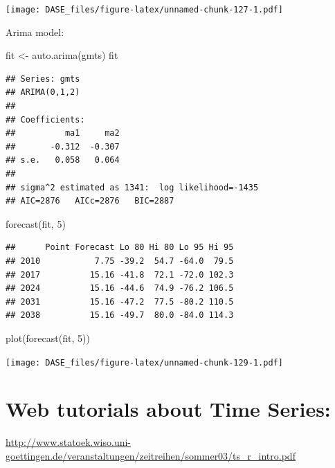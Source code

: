 \documentclass[
]{book}
\newenvironment{Shaded}{\begin{snugshade}}{\end{snugshade}}
\newcommand{\DecValTok}[1]{\textcolor[rgb]{0.00,0.00,0.81}{#1}}
\newcommand{\FunctionTok}[1]{\textcolor[rgb]{0.00,0.00,0.00}{#1}}
\newcommand{\NormalTok}[1]{#1}
\newcommand{\OtherTok}[1]{\textcolor[rgb]{0.56,0.35,0.01}{#1}}
\begin{document}
\texttt{[image: DASE\_files/figure-latex/unnamed-chunk-127-1.pdf]}

Arima model:

\begin{Shaded}
\begin{Highlighting}[]
\NormalTok{fit }\OtherTok{\textless{}{-}} \FunctionTok{auto.arima}\NormalTok{(gmts)}
\NormalTok{fit}
\end{Highlighting}
\end{Shaded}

\begin{verbatim}
## Series: gmts 
## ARIMA(0,1,2) 
## 
## Coefficients:
##          ma1     ma2
##       -0.312  -0.307
## s.e.   0.058   0.064
## 
## sigma^2 estimated as 1341:  log likelihood=-1435
## AIC=2876   AICc=2876   BIC=2887
\end{verbatim}

\begin{Shaded}
\begin{Highlighting}[]
\FunctionTok{forecast}\NormalTok{(fit, }\DecValTok{5}\NormalTok{)}
\end{Highlighting}
\end{Shaded}

\begin{verbatim}
##      Point Forecast Lo 80 Hi 80 Lo 95 Hi 95
## 2010           7.75 -39.2  54.7 -64.0  79.5
## 2017          15.16 -41.8  72.1 -72.0 102.3
## 2024          15.16 -44.6  74.9 -76.2 106.5
## 2031          15.16 -47.2  77.5 -80.2 110.5
## 2038          15.16 -49.7  80.0 -84.0 114.3
\end{verbatim}

\begin{Shaded}
\begin{Highlighting}[]
\FunctionTok{plot}\NormalTok{(}\FunctionTok{forecast}\NormalTok{(fit, }\DecValTok{5}\NormalTok{))}
\end{Highlighting}
\end{Shaded}

\texttt{[image: DASE\_files/figure-latex/unnamed-chunk-129-1.pdf]}

\hypertarget{web-tutorials-about-time-series}{%
\section{Web tutorials about Time Series:}\label{web-tutorials-about-time-series}}

\url{http://www.statoek.wiso.uni-goettingen.de/veranstaltungen/zeitreihen/sommer03/ts_r_intro.pdf}
\end{document}
